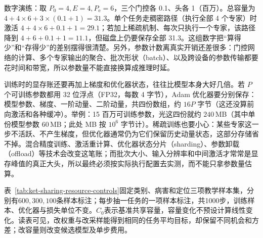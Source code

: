 数字演练：取 $P_0=4,E=4,P_{\mathrm e}=6$，三个门控各 0.1、头各 1（百万）。总容量为 $4+4\times6+3\times(0.1+1)=31.3$。单个任务走稠密路径（执行全部 4 个专家）时激活 $4+4\times6+0.1+1=29.1$；若加上稀疏机制、每次只执行一个专家，该路径降到 $4+6+0.1+1=11.1$，但磁盘上仍要保存全部 31.3。这组数字把“算得少”和“存得少”的差别摆得很清楚。另外，参数计数离真实开销还差很多：门控网络的计算、多个专家输出的聚合、批次形状（batch）、以及跨设备的参数传输都要花时间和带宽，所以参数量不能直接换算成推理时延。

训练时的显存账还要再加上梯度和优化器状态，往往比模型本身大好几倍。若 $P$ 个可训练参数都用 32 位浮点（FP32，每数 4 字节），Adam 优化器要分别保存：模型参数、梯度、一阶动量、二阶动量，共四份数组，约 $16P$ 字节（这还没算前向激活和各种缓冲）。举例：15 百万可训练参数，光这四份就约 $240\,$MB（其中单份模型参数 $60\,$MB；此处 MB 按 $10^6$ 字节计）。稀疏训练也要小心：某些专家这一步不活跃、不产生梯度，但优化器通常仍为它们保留历史动量状态，这部分存储省不掉。混合精度训练、激活重计算、优化器状态分片（sharding）、参数卸载（offload）等技术会改变这笔账；而批次大小、输入分辨率和中间激活才常常是显存峰值的真正大头，所以最终必须按实际执行配置去实测，而不能只拿参数量估算。

表~\ref{tab:ket-sharing-resource-controls}固定类别、病害和定位三项教学样本集，分别有$600,300,100$条样本标注；每步抽一任务的一项样本标注，共1000步，训练样本、优化器与损失单位不变。$C_0$表示基准共享容量，容量变化不预设计算线性变化。读表可见，改权重与改采样能得到相同的任务平均目标，却保留不同机会和方差；改容量则改变候选模型及单步费用。

